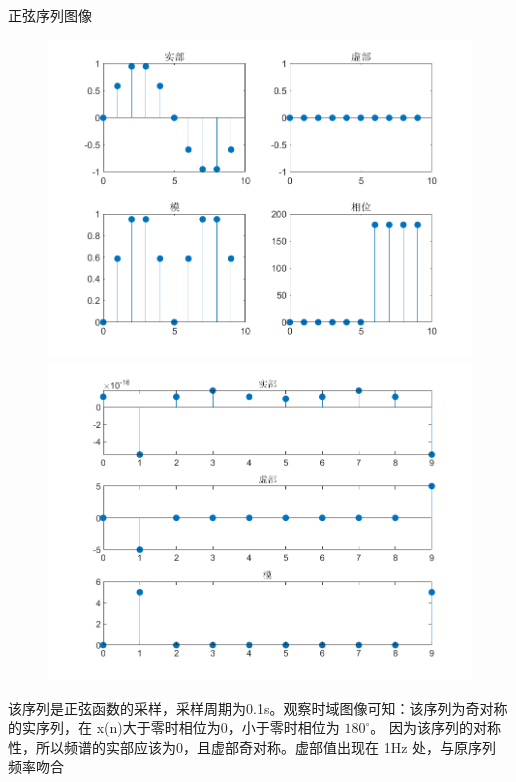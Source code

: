 \documentclass{beamer}
\begin{document}
\begin{frame}[t]{正弦序列图像}
    \begin{figure}[H]
        \centering
        \begin{minipage}[t]{0.48\textwidth}
        \centering
        \includegraphics[width=\textwidth]{figure/正弦序列.png}
        \end{minipage}
        \begin{minipage}[t]{0.48\textwidth}
        \centering
        \includegraphics[width=\textwidth]{figure/频谱_正弦序列.png}
        \end{minipage}
    \end{figure}
    \begin{block}{}
        该序列是正弦函数的采样，采样周期为0.1s。观察时域图像可知：该序列为奇对称的实序列，在
x(n)大于零时相位为0，小于零时相位为 $180^\circ$。
因为该序列的对称性，所以频谱的实部应该为0，且虚部奇对称。虚部值出现在 1Hz 处，与原序列
频率吻合
    \end{block}
\end{frame}
\end{document}
